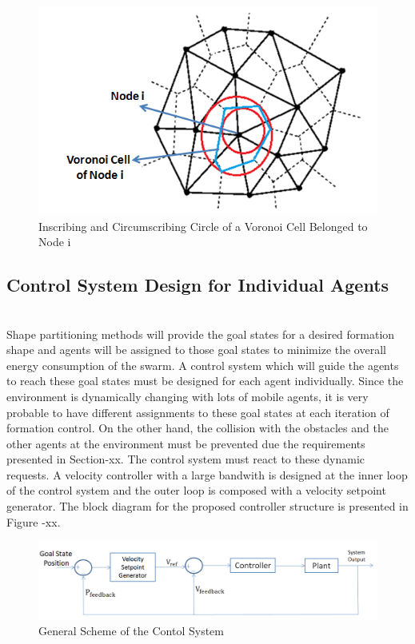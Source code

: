 \begin{figure}[H]
\caption{Inscribing and Circumscribing Circle of a Voronoi Cell Belonged to Node i}
\centering
\includegraphics[scale = 0.70]{voronoi2}
\end{figure}
	
\subsection{Control System Design for Individual Agents}\hspace{0pt} \\
Shape partitioning methods will provide the goal states for a desired formation shape and agents will be assigned to those goal states to minimize the overall energy consumption of the swarm. A control system which will guide the agents to reach these goal states must be designed for each agent individually. Since the environment is dynamically changing with lots of  mobile agents, it is very probable to have different assignments to these goal states at each iteration of formation control. On the other hand, the collision with the obstacles and the other agents at the environment must be prevented due the requirements presented in Section-xx. The control system must react to these dynamic requests. A velocity controller with a large bandwith is designed at the inner loop of the control system and the outer loop is composed with a velocity setpoint generator. The block diagram for the proposed controller structure is presented in Figure -xx.

\begin{figure}[H]
\caption{General Scheme of the Contol System}
\centering
\includegraphics[scale = 0.45]{controller}
\end{figure}

